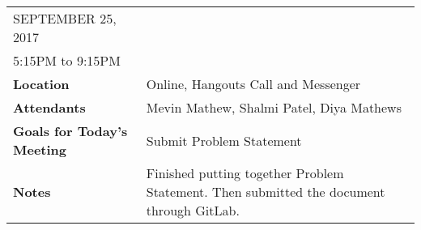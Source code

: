 \documentclass{article}
\begin{document}
\begin{table}[hp]
\begin{tabularx}{\textwidth}{lX}
\toprule
SEPTEMBER 25, 2017\\
5:15PM to 9:15PM\\
\midrule
\textbf{Location} & Online, Hangouts Call and Messenger\\
\textbf{Attendants} & Mevin Mathew, Shalmi Patel, Diya Mathews\\
\midrule
\textbf{Goals for Today's Meeting} & Submit Problem Statement \\
\midrule
\textbf{Notes} & Finished putting together Problem Statement. Then submitted the document through GitLab.\\
\bottomrule
\end{tabularx}
\end{table}
\end{document}
